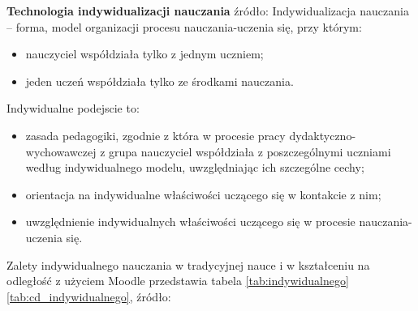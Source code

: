 \textbf{Technologia indywidualizacji nauczania} źródło:\cite{pedagogika}
Indywidualizacja nauczania – forma, model organizacji procesu nauczania-uczenia się, przy którym: \\
	\begin{itemize}
		\item nauczyciel współdziała tylko z jednym uczniem;
		\item jeden uczeń współdziała tylko ze środkami nauczania.
	\end{itemize}
Indywidualne podejscie to:\\
	\begin{itemize}
		\item zasada pedagogiki, zgodnie z która w procesie pracy dydaktyczno-wychowawczej z grupa nauczyciel współdziała z poszczególnymi uczniami według indywidualnego modelu, uwzględniając ich szczególne cechy;
		\item orientacja na indywidualne właściwości uczącego się w kontakcie z nim;
		\item uwzględnienie indywidualnych właściwości uczącego się w procesie nauczania-uczenia się.
	\end{itemize}
Zalety indywidualnego nauczania w tradycyjnej nauce i w kształceniu na odległość z użyciem Moodle przedstawia tabela \ref{tab:indywidualnego} \ref{tab:cd_indywidualnego}, źródło:\cite{pedagogika}
